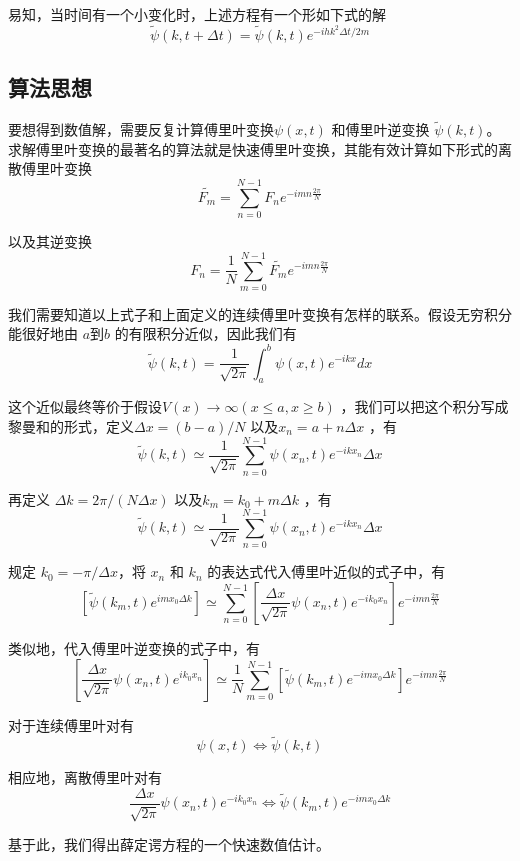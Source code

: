 \documentclass[UTF8,ctexart,a4paper,11pt,openany]{article}
\theoremstyle{definition}
\begin{document}
易知，当时间有一个小变化时，上述方程有一个形如下式的解
$$\widetilde{\psi}(k, t+\Delta t)=\widetilde{\psi}(k, t) e^{-i h k^{2} \Delta t / 2 m}$$
\subsection{算法思想}
要想得到数值解，需要反复计算傅里叶变换$\psi (x,t)$ 
和傅里叶逆变换 $\widetilde{\psi}(k,t)$。求解傅里叶变换的最著名的算法就是快速傅里叶变换，其能有效计算如下形式的离散傅里叶变换
$$\widetilde{F_{m}}=\sum_{n=0}^{N-1} F_{n} e^{-i m n \frac{2 \pi}{N}}$$

以及其逆变换
$$F_{n}=\frac{1}{N} \sum_{m=0}^{N-1} \widetilde{F_{m}} e^{-i m n \frac{2 \pi}{N}}$$

我们需要知道以上式子和上面定义的连续傅里叶变换有怎样的联系。假设无穷积分能很好地由 
 $a$到$b$ 
 的有限积分近似，因此我们有
$$\widetilde{\psi}(k, t)=\frac{1}{\sqrt{2 \pi}} \int_{a}^{b} \psi(x, t) e^{-i k x} d x$$

这个近似最终等价于假设$V(x)\to \infty(x\le a,x\ge b)$ 
，我们可以把这个积分写成黎曼和的形式，定义$\Delta x=(b-a)/N$ 
 以及$x_n=a+n\Delta x$ 
，有
$$\widetilde{\psi}(k, t) \simeq \frac{1}{\sqrt{2 \pi}} \sum_{n=0}^{N-1} \psi\left(x_{n}, t\right) e^{-i k x_{n}} \Delta x$$

再定义 $\Delta k=2\pi /(N\Delta x)$
 以及$k_m=k_0+m\Delta k$ 
 ，有
$$\widetilde{\psi}(k, t) \simeq \frac{1}{\sqrt{2 \pi}} \sum_{n=0}^{N-1} \psi\left(x_{n}, t\right) e^{-i k x_{n}} \Delta x$$

规定 $k_0=-\pi /\Delta x$，将 $x_n $
 和 $k_n$
 的表达式代入傅里叶近似的式子中，有
$$\left[\widetilde{\psi}\left(k_{m}, t\right) e^{i m x_{0} \Delta k}\right] \simeq \sum_{n=0}^{N-1}\left[\frac{\Delta x}{\sqrt{2 \pi}} \psi\left(x_{n}, t\right) e^{-i k_{0} x_{n}}\right] e^{-i m n \frac{2 \pi}{N}}$$

类似地，代入傅里叶逆变换的式子中，有
$$\left[\frac{\Delta x}{\sqrt{2 \pi}} \psi\left(x_{n}, t\right) e^{i k_{0} x_{n}}\right] \simeq \frac{1}{N} \sum_{m=0}^{N-1}\left[\widetilde{\psi}\left(k_{m}, t\right) e^{-i m x_{0} \Delta k}\right] e^{-i m n \frac{2 \pi}{N}}$$

对于连续傅里叶对有
$$\psi(x, t) \Longleftrightarrow \widetilde{\psi}(k, t)$$

相应地，离散傅里叶对有
$$\frac{\Delta x}{\sqrt{2 \pi}} \psi\left(x_{n}, t\right) e^{-i k_{0} x_{n}} \Longleftrightarrow \widetilde{\psi}\left(k_{m}, t\right) e^{-i m x_{0} \Delta k}$$

基于此，我们得出薛定谔方程的一个快速数值估计。
\end{document}
